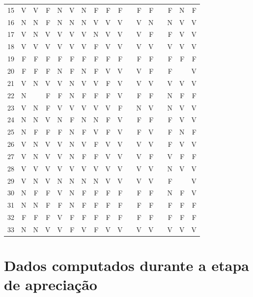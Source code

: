 \begin{apendicesenv}
\begin{center}
\begin{tabular}{ l r r r r r r r r r r r r r r r r}
	15	&	V	&	V	&	F	&	N	&	V	&	N	&	F	&	F	&	F	&       &	F	&	F	&       &	F	&	N	&	F	\\
	16	&	N	&	N	&	F	&	N	&	N	&	N	&	V	&	V	&	V	&       &	V	&	N	&       &	N	&	V	&	V	\\
	17	&	V	&	N	&	V	&	V	&	V	&	V	&	N	&	V	&	V	&       &	V	&	F	&       &	F	&	V	&	V	\\
	18	&	V	&	V	&	V	&	V	&	V	&	V	&	F	&	V	&	V	&       &	V	&	V	&       &	V	&	V	&	V	\\
	19	&	F	&	F	&	F	&	F	&	F	&	F	&	F	&	F	&	F	&       &	F	&	F	&       &	F	&	F	&	F	\\
	20	&	F	&	F	&	F	&	N	&	F	&	N	&	F	&	V	&	V	&       &	V	&	F	&       &	F	&		&	V	\\
	21	&	V	&	N	&	V	&	V	&	N	&	V	&	V	&	F	&	V	&       &	V	&	V	&       &	V	&	V	&	V	\\
	22	&	N	&		&	F	&	F	&	N	&	F	&	F	&	F	&	V	&       &	F	&	F	&       &	N	&	F	&	F	\\
	23	&	V	&	N	&	F	&	V	&	V	&	V	&	V	&	V	&	F	&       &	N	&	V	&       &	N	&	V	&	V	\\
	24	&	N	&	N	&	V	&	N	&	F	&	N	&	N	&	F	&	V	&       &	F	&	F	&       &	F	&	V	&	V	\\
	25	&	N	&	F	&	F	&	F	&	N	&	F	&	V	&	F	&	V	&       &	F	&	V	&       &	F	&	N	&	F	\\
	26	&	V	&	N	&	V	&	V	&	N	&	V	&	F	&	V	&	V	&       &	V	&	V	&       &	F	&	V	&	V	\\
	27	&	V	&	N	&	V	&	V	&	N	&	F	&	F	&	V	&	V	&       &	V	&	F	&       &	V	&	F	&	F	\\
	28	&	V	&	V	&	V	&	V	&	V	&	V	&	V	&	V	&	V	&       &	V	&	V	&       &	N	&	V	&	V	\\
	29	&	V	&	N	&	V	&	N	&	N	&	N	&	N	&	V	&	V	&       &	V	&	V	&       &	F	&		&	V	\\
	30	&	N	&	F	&	F	&	V	&	N	&	F	&	F	&	F	&	F	&       &	F	&	F	&       &	N	&	F	&	V	\\
	31	&	N	&	N	&	F	&	F	&	N	&	F	&	F	&	F	&	F	&       &	F	&	F	&       &	F	&	F	&	F	\\
	32	&	F	&	F	&	F	&	V	&	F	&	F	&	F	&	F	&	F	&       &	F	&	F	&       &	F	&	F	&	F	\\
	33	&	N	&	N	&	V	&	V	&	F	&	V	&	F	&	V	&	V	&       &	V	&	V	&       &	V	&	V	&	V	\\
	\hline
	\bottomrule
	\end{tabular}
\end{center}


\chapter{Dados computados durante a etapa de apreciação}\label{chap:resul3}


\end{apendicesenv}
